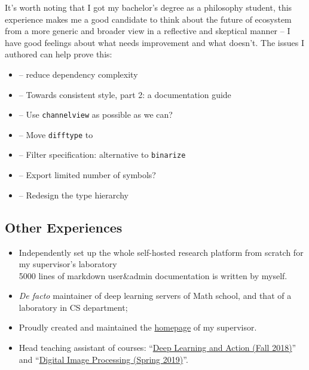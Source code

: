 It's worth noting that I got my bachelor's degree as a philosophy student, this experience makes me a good candidate to think about the future of \images{} ecosystem from a more generic and broader view in a reflective and skeptical manner -- I have good feelings about what needs improvement and what doesn't. The issues I authored can help prove this:
\begin{itemize}
  \item {} -- reduce \images{} dependency complexity
  \item {} -- Towards consistent style, part 2: a documentation guide
  \item {} -- Use \texttt{channelview} as possible as we can?
  \item {} -- Move \texttt{difftype} to \imagecore
  \item {} -- Filter specification: alternative to \texttt{binarize}
  \item {} -- Export limited number of symbols?
  \item {} -- Redesign the type hierarchy
\end{itemize}

\subsection*{Other Experiences}
  \begin{itemize}
      \item Independently set up the whole self-hosted research platform from scratch for my supervisor's laboratory\\
        {\small
        5000 lines of markdown user\&admin documentation is written by myself.
        }
      \item \textit{De facto} maintainer of deep learning servers of Math school, and that of a laboratory in CS department;
      \item Proudly created and maintained the \href{http://math.ecnu.edu.cn/~fli/}{homepage} of my supervisor.
      \item Head teaching assistant of courses: ``\href{http://math.ecnu.edu.cn/~fli/Teaching/DeepLearning/Fall2018/index.html}{Deep Learning and Action (Fall 2018)}''  and ``\href{http://math.ecnu.edu.cn/~fli/Teaching/DigitalImageProcessing/Spring2019/index.html}{Digital Image Processing (Spring 2019)}''.
  \end{itemize}


